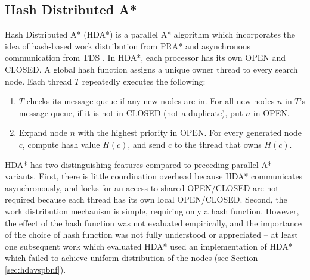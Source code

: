 \documentclass{report}
\begin{document}
\subsection{Hash Distributed A*}

Hash Distributed A* (HDA*) \cite{kishimotofb13} is a parallel A* algorithm 
which incorporates the idea of hash-based work distribution from  PRA* \cite{evett1995massively} and asynchronous communication from TDS \cite{romein1999transposition}.
In HDA*, 
each processor has its own OPEN and CLOSED.
A global hash function assigns a unique owner thread to every search node.
Each thread $T$ repeatedly executes the following: 
\begin{enumerate}
	\item 
           $T$ checks its message queue if any new nodes are in. For all new nodes $n$ in $T$'s message queue, if it is not in CLOSED (not a duplicate), put $n$ in OPEN. %
	\item 
           Expand node $n$ with the highest priority in OPEN. For every generated node $c$, compute hash value $H(c)$, and send $c$ to the thread that owns $H(c)$. %
\end{enumerate}


HDA* has two distinguishing features compared to preceding parallel A* variants.
First, there is little coordination overhead because HDA* communicates asynchronously, and %
locks for an access to shared OPEN/CLOSED are not required because each thread has its own local OPEN/CLOSED.
Second, the work distribution mechanism is simple, requiring only a hash function.
However, the effect of the hash function was not evaluated empirically, and the importance of the choice of hash function was not fully understood or appreciated --
at least one subsequent work which evaluated HDA* used an implementation of HDA* which failed to achieve uniform distribution of the nodes (see Section \ref{sec:hdavspbnf}).%
\end{document}
